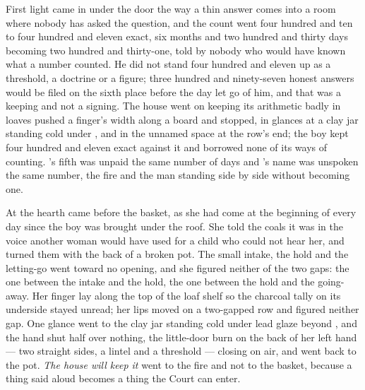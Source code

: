 First light came in under the door the way a thin answer comes into a room where nobody has asked the question, and the count went four hundred and ten to four hundred and eleven exact, six months and two hundred and thirty days becoming two hundred and thirty-one, told by nobody who would have known what a number counted. He did not stand four hundred and eleven up as a threshold, a doctrine or a figure; three hundred and ninety-seven honest answers would be filed on the sixth place before the day let go of him, and that was a keeping and not a signing. The house went on keeping its arithmetic badly in loaves pushed a finger's width along a board and stopped, in glances at a clay jar standing cold under , and in the unnamed space at the row's end; the boy kept four hundred and eleven exact against it and borrowed none of its ways of counting. 's fifth was unpaid the same number of days and 's name was unspoken the same number, the fire and the man standing side by side without becoming one.

At the hearth  came before the basket, as she had come at the beginning of every day since the boy was brought under the roof. She told the coals it was  in the voice another woman would have used for a child who could not hear her, and turned them with the back of a broken pot. The small intake, the hold and the letting-go went toward no opening, and she figured neither of the two gaps: the one between the intake and the hold, the one between the hold and the going-away. Her finger lay along the top of the loaf shelf so the charcoal tally on its underside stayed unread; her lips moved on a two-gapped row and figured neither gap. One glance went to the clay jar standing cold under lead glaze beyond , and the hand shut half over nothing, the little-door burn on the back of her left hand --- two straight sides, a lintel and a threshold --- closing on air, and went back to the pot. \emph{The house will keep it} went to the fire and not to the basket, because a thing said aloud becomes a thing the Court can enter.

